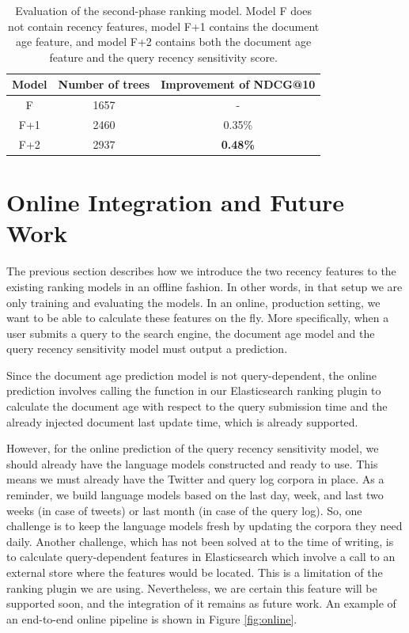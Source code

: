 \begin{table}[]
\centering
\caption{Evaluation of the second-phase ranking model. Model F does not contain recency features, model F+1 contains the document age feature, and model F+2 contains both the document age feature and the query recency sensitivity score.}
\label{tb:res}
\begin{tabular}{@{}ccc@{}}
\toprule
Model & \multicolumn{1}{l}{Number of trees} & Improvement of NDCG@10 \\ \midrule
F & 1657 & - \\
F+1 & 2460 & 0.35\% \\
F+2 & 2937 & \textbf{0.48\%} \\ \bottomrule
\end{tabular}
\end{table}

\section{Online Integration and Future Work}
The previous section describes how we introduce the two recency features to the existing ranking models in an offline fashion. In other words, in that setup we are only training and evaluating the models. In an online, production setting, we want to be able to calculate these features on the fly. More specifically, when a user submits a query to the search engine, the document age model and the query recency sensitivity model must output a prediction.

Since the document age prediction model is not query-dependent, the online prediction involves calling the function in our Elasticsearch ranking plugin to calculate the document age with respect to the query submission time and the already injected document last update time, which is already supported.

However, for the online prediction of the query recency sensitivity model, we should already have the language models constructed and ready to use. This means we must already have the Twitter and query log corpora in place. As a reminder, we build language models based on the last day, week, and last two weeks (in case of tweets) or last month (in case of the query log). So, one challenge is to keep the language models fresh by updating the corpora they need daily. Another challenge, which has not been solved at to the time of writing, is to calculate query-dependent features in Elasticsearch which involve a call to an external store where the features would be located. This is a limitation of the ranking plugin we are using. Nevertheless, we are certain this feature will be supported soon, and the integration of it remains as future work. An example of an end-to-end online pipeline is shown in Figure \ref{fig:online}.

